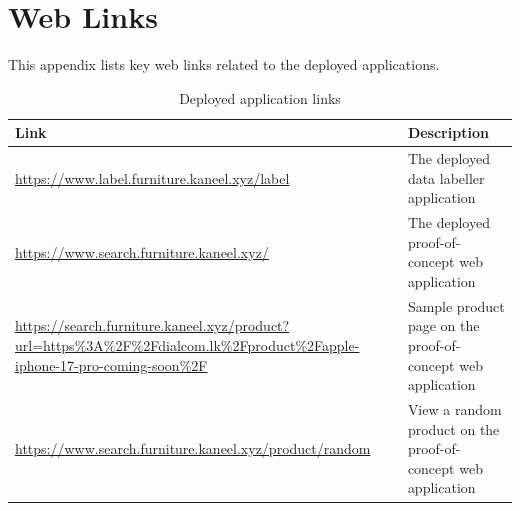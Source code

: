 \chapter{Web Links}\label{app:web_links}

This appendix lists key web links related to the deployed applications.

\begin{table}[H]
    \centering
    \small
    \renewcommand{\arraystretch}{1.2}
    \begin{tabularx}{\textwidth}{X X}
        \toprule
        \textbf{Link} & \textbf{Description} \\
        \midrule
        \url{https://www.label.furniture.kaneel.xyz/label} & The deployed data labeller application \\
        \url{https://www.search.furniture.kaneel.xyz/} & The deployed proof-of-concept web application \\
        \url{https://search.furniture.kaneel.xyz/product?url=https\%3A\%2F\%2Fdialcom.lk\%2Fproduct\%2Fapple-iphone-17-pro-coming-soon\%2F} & Sample product page on the proof-of-concept web application \\
        \url{https://www.search.furniture.kaneel.xyz/product/random} & View a random product on the proof-of-concept web application \\
        \bottomrule
    \end{tabularx}
    \caption{Deployed application links}
    \label{tab:web-links}
\end{table}

